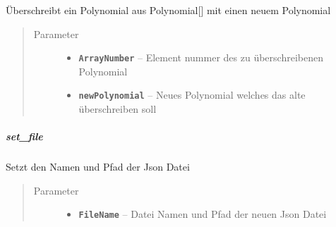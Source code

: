 \documentclass[letterpaper,10pt,ngerman]{sphinxmanual}
\begin{document}
\begin{fulllineitems}
\label{com/linuxluigi/polynomial/PolynomialList:com.linuxluigi.polynomial.PolynomialList.set(int, Polynomial)}
Überschreibt ein Polynomial aus Polynomial{[}{]} mit einen neuem Polynomial
\begin{quote}\begin{description}
\item[{Parameter}] \leavevmode\begin{itemize}
\item {} 
\textbf{\texttt{ArrayNumber}} -- Element nummer des zu überschreibenen Polynomial

\item {} 
\textbf{\texttt{newPolynomial}} -- Neues Polynomial welches das alte überschreiben soll

\end{itemize}

\end{description}\end{quote}

\end{fulllineitems}



\subparagraph{set\_file}
\label{com/linuxluigi/polynomial/PolynomialList:set-file}

\begin{fulllineitems}
\label{com/linuxluigi/polynomial/PolynomialList:com.linuxluigi.polynomial.PolynomialList.set_file(String)}
Setzt den Namen und Pfad der Json Datei
\begin{quote}\begin{description}
\item[{Parameter}] \leavevmode\begin{itemize}
\item {} 
\textbf{\texttt{FileName}} -- Datei Namen und Pfad der neuen Json Datei

\end{itemize}

\end{description}\end{quote}

\end{fulllineitems}
\end{document}
